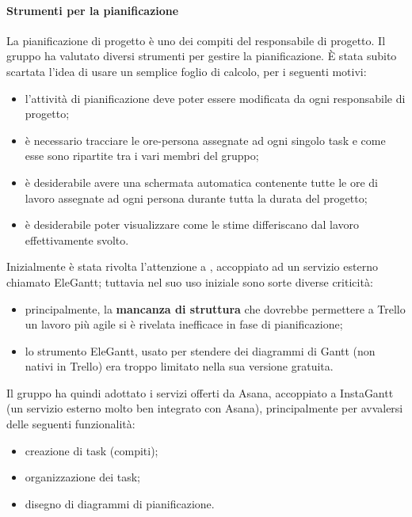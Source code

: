 \paragraph{Strumenti per la pianificazione}
La pianificazione di progetto è uno dei compiti del responsabile di progetto. Il gruppo ha valutato diversi strumenti per gestire la pianificazione. È stata subito scartata l'idea di usare un semplice foglio di calcolo, per i seguenti motivi:
\begin{itemize}
	\item l'attività di pianificazione deve poter essere modificata da ogni responsabile di progetto;
	\item è necessario tracciare le ore-persona assegnate ad ogni singolo task e come esse sono ripartite tra i vari membri del gruppo;
	\item è desiderabile avere una schermata automatica contenente tutte le ore di lavoro assegnate ad ogni persona durante tutta la durata del progetto;
	\item è desiderabile poter visualizzare come le stime differiscano dal lavoro effettivamente svolto.
\end{itemize}
Inizialmente è stata rivolta l'attenzione a , accoppiato ad un servizio esterno chiamato EleGantt; tuttavia nel suo uso iniziale sono sorte diverse criticità:
\begin{itemize}
	\item principalmente, la \textbf{mancanza di struttura} che dovrebbe permettere a Trello un lavoro più agile si è rivelata inefficace in fase di pianificazione;
	\item lo strumento EleGantt, usato per stendere dei diagrammi di Gantt (non nativi in Trello) era troppo limitato nella sua versione gratuita.
\end{itemize}
Il gruppo ha quindi adottato i servizi offerti da Asana, accoppiato a InstaGantt (un servizio esterno molto ben integrato con Asana), principalmente per avvalersi delle seguenti funzionalità:
\begin{itemize}
	\item creazione di task (compiti);
	\item organizzazione dei task;
	\item disegno di diagrammi di pianificazione.
\end{itemize}

